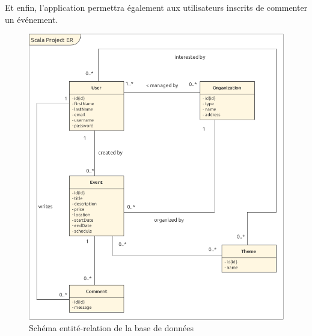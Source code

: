 \documentclass[11pt, a4paper, french, twoside]{article}
\begin{document}
		Et enfin, l'application permettra également aux utilisateurs inscrits de commenter un événement.
		
		\begin{figure}[h]
			\centering
			\includegraphics[width=0.8\linewidth]{images/project_ER.png}
			\caption{Schéma entité-relation de la base de données}
			\label{fig:er}
		\end{figure}
	
\end{document}
